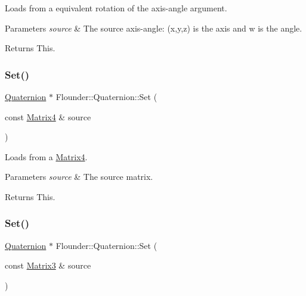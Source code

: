 Loads from a equivalent rotation of the axis-\/angle argument. 


\begin{DoxyParams}{Parameters}
{\em source} & The source axis-\/angle\+: (x,y,z) is the axis and w is the angle. \\
\hline
\end{DoxyParams}
\begin{DoxyReturn}{Returns}
This. 
\end{DoxyReturn}
\mbox{\label{class_flounder_1_1_quaternion_acb46e5b52274d76efaa49a756a5fa341}} 
\subsubsection{\texorpdfstring{Set()}{Set()}\hspace{0.1cm}{\footnotesize\ttfamily [4/5]}}
{\footnotesize\ttfamily \hyperlink{class_flounder_1_1_quaternion}{Quaternion} $\ast$ Flounder\+::\+Quaternion\+::\+Set (\begin{DoxyParamCaption}\item[{const \hyperlink{class_flounder_1_1_matrix4}{Matrix4} \&}]{source }\end{DoxyParamCaption})}



Loads from a \hyperlink{class_flounder_1_1_matrix4}{Matrix4}. 


\begin{DoxyParams}{Parameters}
{\em source} & The source matrix. \\
\hline
\end{DoxyParams}
\begin{DoxyReturn}{Returns}
This. 
\end{DoxyReturn}
\mbox{\label{class_flounder_1_1_quaternion_a2c4b6359a6910830ef778df6ada382cd}} 
\subsubsection{\texorpdfstring{Set()}{Set()}\hspace{0.1cm}{\footnotesize\ttfamily [5/5]}}
{\footnotesize\ttfamily \hyperlink{class_flounder_1_1_quaternion}{Quaternion} $\ast$ Flounder\+::\+Quaternion\+::\+Set (\begin{DoxyParamCaption}\item[{const \hyperlink{class_flounder_1_1_matrix3}{Matrix3} \&}]{source }\end{DoxyParamCaption})}



